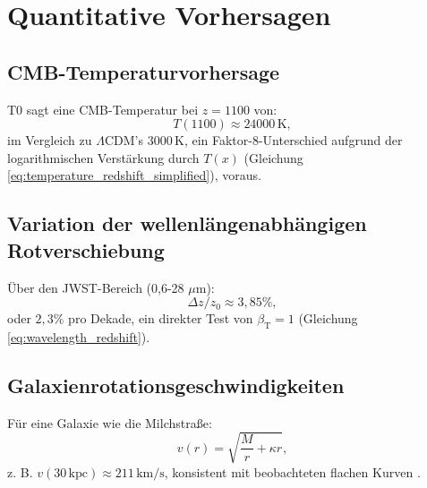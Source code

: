 \documentclass[12pt,a4paper]{article}
\newcommand{\Tfield}{T(x)}
\newcommand{\betaT}{\beta_{\text{T}}}
\begin{document}
	\section{Quantitative Vorhersagen}
	\label{sec:predictions}
	
	\subsection{CMB-Temperaturvorhersage}
	\label{subsec:cmb_temp_prediction}
	
	T0 sagt eine CMB-Temperatur bei \(z = 1100\) von:
	\begin{equation}
		T(1100) \approx 24000 \, \text{K},
		\label{eq:cmb_temp_t0}
	\end{equation}
	im Vergleich zu \(\Lambda\)CDM’s \(3000 \, \text{K}\), ein Faktor-8-Unterschied aufgrund der logarithmischen Verstärkung durch \(\Tfield\) (Gleichung \ref{eq:temperature_redshift_simplified}), voraus.
	
	\subsection{Variation der wellenlängenabhängigen Rotverschiebung}
	\label{subsec:wavelength_redshift_prediction}
	
	Über den JWST-Bereich (0,6-28 \(\mu\text{m}\)):
	\begin{equation}
		\Delta z / z_0 \approx 3,85\%,
		\label{eq:wavelength_variation}
	\end{equation}
	oder \(2,3\%\) pro Dekade, ein direkter Test von \(\betaT = 1\) (Gleichung \ref{eq:wavelength_redshift}).
	
	\subsection{Galaxienrotationsgeschwindigkeiten}
	\label{subsec:rotation_velocity_prediction}
	
	Für eine Galaxie wie die Milchstraße:
	\begin{equation}
		v(r) = \sqrt{\frac{M}{r} + \kappa r},
		\label{eq:rotation_velocity_repeat}
	\end{equation}
	z. B. \(v(30 \, \text{kpc}) \approx 211 \, \text{km/s}\), konsistent mit beobachteten flachen Kurven \cite{McGaugh2016}.
	
\end{document}
